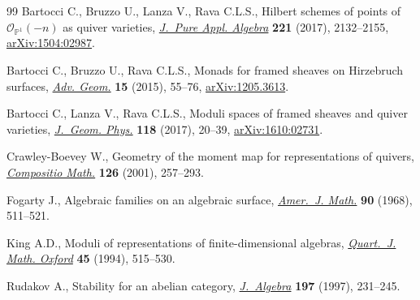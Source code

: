 \documentclass[11pt]{article}
\numberwithin{equation}{section}
\numberwithin{equation}{section}
\begin{document}
\begin{thebibliography}{99}
Bartocci C., Bruzzo U., Lanza V., Rava C.L.S., Hilbert schemes of points of
 {${\mathcal O}_{{\mathbb P}^1}(-n)$} as quiver varieties, \href{https://doi.org/10.1016/j.jpaa.2016.12.012}{\textit{J.~Pure
 Appl. Algebra}} \textbf{221} (2017), 2132--2155, \href{https://arxiv.org/abs/1504:02987}{arXiv:1504:02987}.

Bartocci C., Bruzzo U., Rava C.L.S., Monads for framed sheaves on {H}irzebruch
 surfaces, \href{https://doi.org/10.1515/advgeom-2014-0027}{\textit{Adv. Geom.}} \textbf{15} (2015), 55--76, \href{https://arxiv.org/abs/1205.3613}{arXiv:1205.3613}.

Bartocci C., Lanza V., Rava C.L.S., Moduli spaces of framed sheaves and quiver
 varieties, \href{https://doi.org/10.1016/j.geomphys.2016.10.011}{\textit{J.~Geom. Phys.}} \textbf{118} (2017), 20--39,
 \href{https://arxiv.org/abs/1610:02731}{arXiv:1610:02731}.

Crawley-Boevey W., Geometry of the moment map for representations of quivers,
 \href{https://doi.org/10.1023/A:1017558904030}{\textit{Compositio Math.}} \textbf{126} (2001), 257--293.

Fogarty J., Algebraic families on an algebraic surface, \href{https://doi.org/10.2307/2373541}{\textit{Amer.~J. Math.}}
 \textbf{90} (1968), 511--521.

King A.D., Moduli of representations of finite-dimensional algebras,
 \href{https://doi.org/10.1093/qmath/45.4.515}{\textit{Quart.~J. Math. Oxford}} \textbf{45} (1994), 515--530.

Rudakov A., Stability for an abelian category, \href{https://doi.org/10.1006/jabr.1997.7093}{\textit{J.~Algebra}} \textbf{197}
 (1997), 231--245.

\end{thebibliography}
\end{document}

